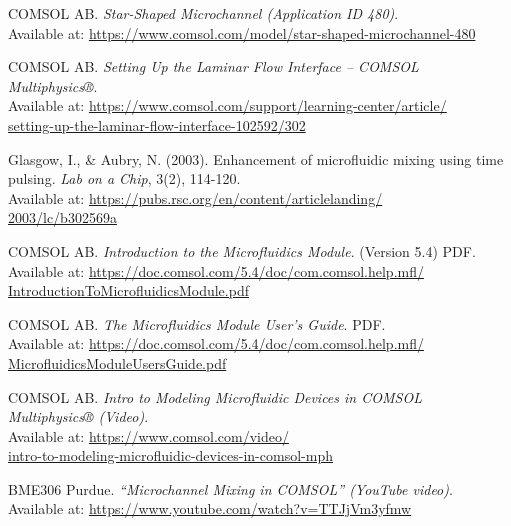 \documentclass[12pt,a4paper]{article}
\begin{document}
\begin{enumerate}[label={[\arabic*]}]
  \item COMSOL AB. \textit{Star-Shaped Microchannel (Application ID 480)}. \\
  Available at: \url{https://www.comsol.com/model/star-shaped-microchannel-480}
  
  \item COMSOL AB. \textit{Setting Up the Laminar Flow Interface -- COMSOL Multiphysics®}. \\
  Available at: \url{https://www.comsol.com/support/learning-center/article/}\\
  \url{setting-up-the-laminar-flow-interface-102592/302}
  
  \item Glasgow, I., \& Aubry, N. (2003). Enhancement of microfluidic mixing using time pulsing. \textit{Lab on a Chip}, 3(2), 114-120. \\
  Available at: \url{https://pubs.rsc.org/en/content/articlelanding/}\\
  \url{2003/lc/b302569a}
  
  \item COMSOL AB. \textit{Introduction to the Microfluidics Module}. (Version 5.4) PDF. \\
  Available at: \url{https://doc.comsol.com/5.4/doc/com.comsol.help.mfl/}\\
  \url{IntroductionToMicrofluidicsModule.pdf}
  
  \item COMSOL AB. \textit{The Microfluidics Module User's Guide}. PDF. \\
  Available at: \url{https://doc.comsol.com/5.4/doc/com.comsol.help.mfl/}\\
  \url{MicrofluidicsModuleUsersGuide.pdf}
  
  \item COMSOL AB. \textit{Intro to Modeling Microfluidic Devices in COMSOL Multiphysics® (Video)}. \\
  Available at: \url{https://www.comsol.com/video/}\\
  \url{intro-to-modeling-microfluidic-devices-in-comsol-mph}
  
  \item BME306 Purdue. \textit{``Microchannel Mixing in COMSOL'' (YouTube video)}. \\
  Available at: \url{https://www.youtube.com/watch?v=TTJjVm3yfmw}
\end{enumerate}

\newpage
\appendix
\end{document}
